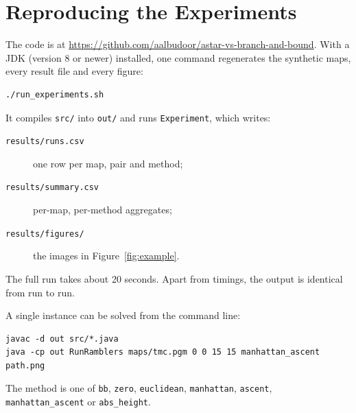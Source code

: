 \chapter{Reproducing the Experiments}
\label{app:reproduce}

The code is at \url{https://github.com/aalbudoor/astar-vs-branch-and-bound}. With a JDK (version 8 or newer) installed, one command regenerates the synthetic maps, every result file and every figure:

\begin{verbatim}
./run_experiments.sh
\end{verbatim}

It compiles \texttt{src/} into \texttt{out/} and runs \texttt{Experiment}, which writes:
\begin{description}
  \item[\texttt{results/runs.csv}] one row per map, pair and method;
  \item[\texttt{results/summary.csv}] per-map, per-method aggregates;
  \item[\texttt{results/figures/}] the images in Figure~\ref{fig:example}.
\end{description}
The full run takes about 20 seconds. Apart from timings, the output is identical from run to run.

A single instance can be solved from the command line:
\begin{verbatim}
javac -d out src/*.java
java -cp out RunRamblers maps/tmc.pgm 0 0 15 15 manhattan_ascent path.png
\end{verbatim}
The method is one of \texttt{bb}, \texttt{zero}, \texttt{euclidean}, \texttt{manhattan}, \texttt{ascent}, \texttt{manhattan\_ascent} or \texttt{abs\_height}.
